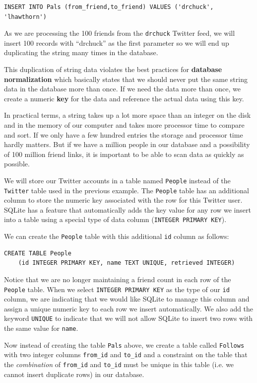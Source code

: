 \documentclass[11pt]{book}
\begin{document}
\beforeverb
\begin{verbatim}
INSERT INTO Pals (from_friend,to_friend) VALUES ('drchuck', 'lhawthorn')
\end{verbatim}
\afterverb
%
As we are processing the 100 friends from the {\tt drchuck}
Twitter feed, we will insert 100 records with ``drchuck''
as the first parameter so we will end up duplicating the 
string many times in the database.

This duplication of string data violates the best practices 
for {\bf database normalization} which basically states that
we should never put the same string data in the database more than once.  
If we need the data more than once, we create a 
numeric {\bf key} for the data and reference the actual data 
using this key.

In practical terms, a string takes up a lot more 
space than an integer on the disk
and in the memory of our computer and takes more processor time
to compare and sort.  If we only have a few hundred entries 
the storage and processor time hardly matters.  But if we have 
a million people in our database and a possibility of 100 million
friend links, it is important to be able to scan data as quickly
as possible.

We will store our Twitter accounts in a table named {\tt People}
instead of the {\tt Twitter} table used in the previous example.
The {\tt People} table has an additional column 
to store the numeric key associated with the 
row for this Twitter user.   
SQLite has a feature that automatically adds the key value
for any row we insert into a table using a special type of 
data column ({\tt INTEGER PRIMARY KEY}).

We can create the {\tt People} table with this additional 
{\tt id} column as follows:

\beforeverb
\begin{verbatim}
CREATE TABLE People 
    (id INTEGER PRIMARY KEY, name TEXT UNIQUE, retrieved INTEGER)
\end{verbatim}
\afterverb
%
Notice that we are no longer maintaining a friend count in each row
of the {\tt People} table.
When we select {\tt INTEGER PRIMARY KEY} as the type of our {\tt id} column,
we are indicating that we would like SQLite to manage this column and 
assign a unique numeric key to each row we insert automatically.
We also add the keyword {\tt UNIQUE} to indicate that we will not 
allow SQLite to insert two rows with the same value for {\tt name}.

Now instead of creating the table {\tt Pals} above, we create
a table called {\tt Follows} with two integer columns
\verb"from_id" and \verb"to_id" and a constraint on the table that
the \emph{combination} of \verb"from_id" and \verb"to_id" must be unique 
in this table (i.e. we cannot insert duplicate rows) in our database.
\end{document}
